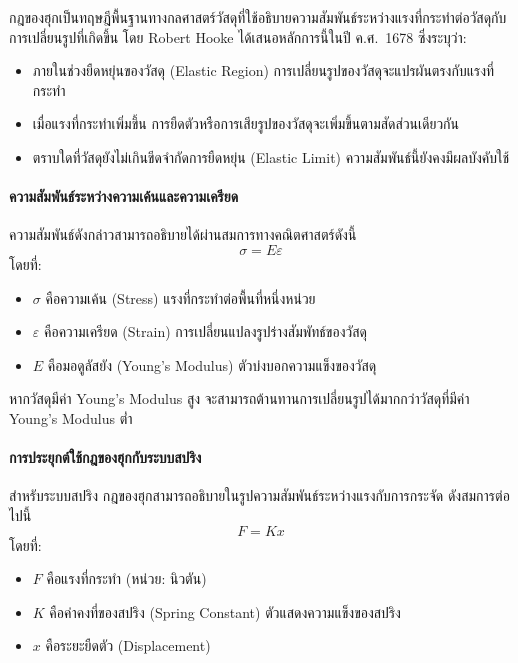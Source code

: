 กฎของฮุกเป็นทฤษฎีพื้นฐานทางกลศาสตร์วัสดุที่ใช้อธิบายความสัมพันธ์ระหว่างแรงที่กระทำต่อวัสดุกับการเปลี่ยนรูปที่เกิดขึ้น โดย Robert Hooke ได้เสนอหลักการนี้ในปี ค.ศ.\ 1678 ซึ่งระบุว่า:
\begin{itemize}
    \item ภายในช่วงยืดหยุ่นของวัสดุ (Elastic Region) การเปลี่ยนรูปของวัสดุจะแปรผันตรงกับแรงที่กระทำ
    \item เมื่อแรงที่กระทำเพิ่มขึ้น การยืดตัวหรือการเสียรูปของวัสดุจะเพิ่มขึ้นตามสัดส่วนเดียวกัน
    \item ตราบใดที่วัสดุยังไม่เกินขีดจำกัดการยืดหยุ่น (Elastic Limit) ความสัมพันธ์นี้ยังคงมีผลบังคับใช้
\end{itemize}

\paragraph{ความสัมพันธ์ระหว่างความเค้นและความเครียด}

ความสัมพันธ์ดังกล่าวสามารถอธิบายได้ผ่านสมการทางคณิตศาสตร์ดังนี้
\begin{equation}
    \sigma = E \varepsilon
\end{equation}
โดยที่:
\begin{itemize}
    \item $\sigma$ คือความเค้น (Stress) แรงที่กระทำต่อพื้นที่หนึ่งหน่วย
    \item $\varepsilon$ คือความเครียด (Strain) การเปลี่ยนแปลงรูปร่างสัมพัทธ์ของวัสดุ
    \item $E$ คือมอดูลัสยัง (Young's Modulus) ตัวบ่งบอกความแข็งของวัสดุ
\end{itemize}

หากวัสดุมีค่า Young's Modulus สูง จะสามารถต้านทานการเปลี่ยนรูปได้มากกว่าวัสดุที่มีค่า Young's Modulus ต่ำ

\paragraph{การประยุกต์ใช้กฎของฮุกกับระบบสปริง}

สำหรับระบบสปริง กฎของฮุกสามารถอธิบายในรูปความสัมพันธ์ระหว่างแรงกับการกระจัด ดังสมการต่อไปนี้
\begin{equation}
    F = K x
    \label{eq:hooke}
\end{equation}
โดยที่:
\begin{itemize}
    \item $F$ คือแรงที่กระทำ (หน่วย: นิวตัน)
    \item $K$ คือค่าคงที่ของสปริง (Spring Constant) ตัวแสดงความแข็งของสปริง
    \item $x$ คือระยะยืดตัว (Displacement)
\end{itemize}

